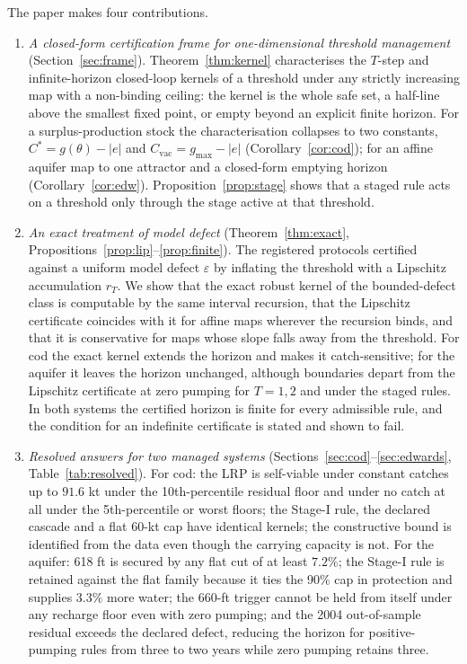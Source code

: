 \documentclass[11pt,a4paper]{article}
\theoremstyle{plain}
\theoremstyle{definition}
\theoremstyle{remark}
\newcommand{\LRP}{\theta}
\newcommand{\Cstar}{C^{*}}
\newcommand{\Cvac}{C_{\mathrm{vac}}}
\newcommand{\gmax}{g_{\max}}
\begin{document}
The paper makes four contributions.

\begin{enumerate}[leftmargin=2em]
\item \emph{A closed-form certification frame for one-dimensional threshold management} (Section~\ref{sec:frame}). Theorem~\ref{thm:kernel} characterises the $T$-step and infinite-horizon closed-loop kernels of a threshold under any strictly increasing map with a non-binding ceiling: the kernel is the whole safe set, a half-line above the smallest fixed point, or empty beyond an explicit finite horizon. For a surplus-production stock the characterisation collapses to two constants, $\Cstar=g(\LRP)-|e|$ and $\Cvac=\gmax-|e|$ (Corollary~\ref{cor:cod}); for an affine aquifer map to one attractor and a closed-form emptying horizon (Corollary~\ref{cor:edw}). Proposition~\ref{prop:stage} shows that a staged rule acts on a threshold only through the stage active at that threshold.
\item \emph{An exact treatment of model defect} (Theorem~\ref{thm:exact}, Propositions~\ref{prop:lip}--\ref{prop:finite}). The registered protocols certified against a uniform model defect $\varepsilon$ by inflating the threshold with a Lipschitz accumulation $r_T$. We show that the exact robust kernel of the bounded-defect class is computable by the same interval recursion, that the Lipschitz certificate coincides with it for affine maps wherever the recursion binds, and that it is conservative for maps whose slope falls away from the threshold. For cod the exact kernel extends the horizon and makes it catch-sensitive; for the aquifer it leaves the horizon unchanged, although boundaries depart from the Lipschitz certificate at zero pumping for $T=1,2$ and under the staged rules. In both systems the certified horizon is finite for every admissible rule, and the condition for an indefinite certificate is stated and shown to fail.
\item \emph{Resolved answers for two managed systems} (Sections~\ref{sec:cod}--\ref{sec:edwards}, Table~\ref{tab:resolved}). For cod: the LRP is self-viable under constant catches up to $91.6$ kt under the 10th-percentile residual floor and under no catch at all under the 5th-percentile or worst floors; the Stage-I rule, the declared cascade and a flat 60-kt cap have identical kernels; the constructive bound is identified from the data even though the carrying capacity is not. For the aquifer: 618 ft is secured by any flat cut of at least $7.2\%$; the Stage-I rule is retained against the flat family because it ties the 90\% cap in protection and supplies $3.3\%$ more water; the 660-ft trigger cannot be held from itself under any recharge floor even with zero pumping; and the 2004 out-of-sample residual exceeds the declared defect, reducing the horizon for positive-pumping rules from three to two years while zero pumping retains three.

\end{enumerate}
\end{document}
